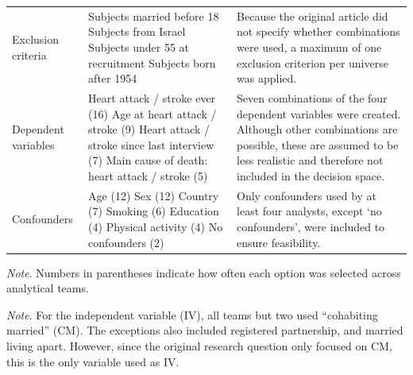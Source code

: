 \documentclass{article}
\begin{document}
\begin{table}[htbp]
\begin{threeparttable}
\begin{tabularx}{\textwidth}{
>{\RaggedRight\arraybackslash}p{3.2cm}
>{\RaggedRight\arraybackslash}p{6.2cm}
>{\RaggedRight\arraybackslash}X
}
Exclusion criteria &
Subjects married before 18 \newline
Subjects from Israel \newline
Subjects under 55 at recruitment \newline
Subjects born after 1954
&
Because the original article did not specify whether combinations were used, a maximum of one exclusion criterion per universe was applied. \\

\addlinespace
\addlinespace
Dependent variables &
Heart attack / stroke ever (16) \newline
Age at heart attack / stroke (9) \newline
Heart attack / stroke since last interview (7) \newline
Main cause of death: heart attack / stroke (5)
&
Seven combinations of the four dependent variables were created. Although other combinations are possible, these are assumed to be less realistic and therefore not included in the decision space. \\

\addlinespace

Confounders &
Age (12) \newline
Sex (12) \newline
Country (7) \newline
Smoking (6) \newline
Education (4) \newline
Physical activity (4) \newline
No confounders (2)
&
Only confounders used by at least four analysts, except `no confounders', were included to ensure feasibility. \\

\bottomrule
\end{tabularx}

\begin{tablenotes}[flushleft]
\footnotesize
\item \textit{Note}. Numbers in parentheses indicate how often each option was selected across analytical teams.
\item \textit{Note}. For the independent variable (IV), all teams but two used “cohabiting married” (CM). The exceptions also included registered partnership, and married living apart. However, since the original research question only focused on CM, this is the only variable used as IV.

\end{tablenotes}

\end{threeparttable}
\end{table}
\end{document}

